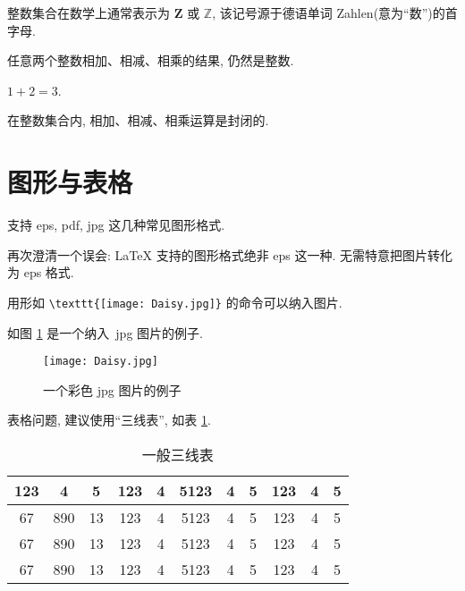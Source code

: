 \documentclass{WHUMaster}   %
\begin{document}
\begin{remark}
	整数集合在数学上通常表示为 $\mathbf{Z}$ 或 $\mathbb{Z}$, 该记号源于德语单词 Zahlen(意为``数'')的首字母.
\end{remark}

\begin{proposition}
任意两个整数相加、相减、相乘的结果, 仍然是整数.
\end{proposition}

\begin{example}
	$1+2=3$.
\end{example}

\begin{corollary}
	 在整数集合内, 相加、相减、相乘运算是封闭的.
\end{corollary}

\section{图形与表格}

支持 eps, pdf, jpg 这几种常见图形格式.

再次澄清一个误会: \LaTeX{} 支持的图形格式绝非 eps 这一种. 无需特意把图片转化为 eps 格式.

用形如 \verb|\texttt{[image: Daisy.jpg]}| 的命令可以纳入图片.

如图 \ref{fig:1} 是一个纳入~jpg 图片的例子.

\begin{figure}[ht]
\centering
	\texttt{[image: Daisy.jpg]}
	\caption{一个彩色 jpg 图片的例子}
	\label{fig:1}
\end{figure}

表格问题, 建议使用``三线表'', 如表 \ref{tab:1}.

\begin{table}[ht]
\centering
\caption{一般三线表}
\label{tab:1}
		\begin{tabular}{c c c c c c c c c c c}
		\hline
		123 & 4  & 5  & 123 & 4 & 5123 & 4 & 5 & 123 & 4 & 5\\
		\hline
		67 & 890 & 13 & 123 & 4 & 5123 & 4 & 5 & 123 & 4 & 5\\
		67 & 890 & 13 & 123 & 4 & 5123 & 4 & 5 & 123 & 4 & 5\\
		67 & 890 & 13 & 123 & 4 & 5123 & 4 & 5 & 123 & 4 & 5\\
		\hline
		\end{tabular}
\end{table}
\end{document}
